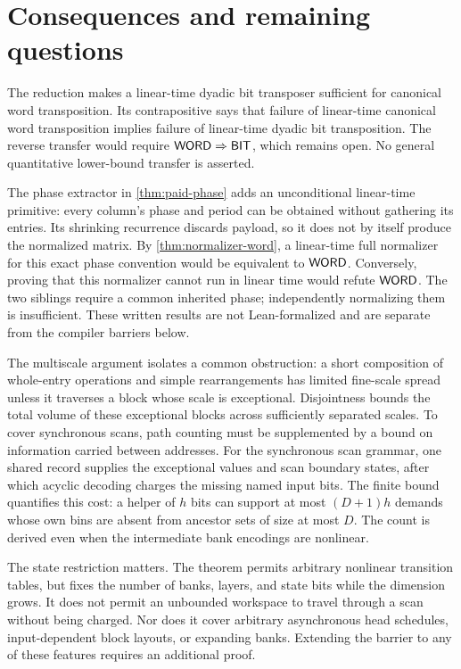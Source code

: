 \section{Consequences and remaining questions}
The reduction makes a linear-time dyadic bit transposer sufficient
for canonical word transposition. Its contrapositive says that failure of linear-time canonical word
transposition implies failure of linear-time dyadic bit transposition.
The reverse transfer would require $\mathsf{WORD}\Rightarrow\mathsf{BIT}$, which
remains open. No general quantitative lower-bound transfer is asserted.

The phase extractor in \cref{thm:paid-phase} adds an unconditional
linear-time primitive: every column's phase and period can be obtained
without gathering its entries. Its shrinking recurrence discards payload,
so it does not by itself produce the normalized matrix. By
\cref{thm:normalizer-word}, a linear-time full normalizer for this exact
phase convention would be equivalent to $\mathsf{WORD}$. Conversely, proving
that this normalizer cannot run in linear time would refute $\mathsf{WORD}$.
The two siblings require a common inherited phase; independently
normalizing them is insufficient. These written results are not
Lean-formalized and are separate from the compiler barriers below.

The multiscale argument isolates a common obstruction: a short composition of
whole-entry operations and simple rearrangements has limited fine-scale
spread unless it traverses a block whose scale is exceptional. Disjointness
bounds the total volume of these exceptional blocks across sufficiently
separated scales. To cover synchronous scans, path counting must be supplemented by a bound
on information carried between addresses. For the synchronous scan grammar, one shared record supplies the
exceptional values and scan boundary states, after which acyclic decoding
charges the missing named input bits. The finite bound quantifies this cost:
a helper of $h$ bits can support at most $(D+1)h$ demands whose own bins
are absent from ancestor sets of size at most $D$. The count is derived even when the intermediate bank encodings are nonlinear.

The state restriction matters. The theorem permits arbitrary nonlinear
transition tables, but fixes the number of banks, layers, and state bits while
the dimension grows. It does not permit an unbounded workspace to travel
through a scan without being charged. Nor does it cover arbitrary asynchronous
head schedules, input-dependent block layouts, or expanding banks. Extending
the barrier to any of these features requires an additional proof.

